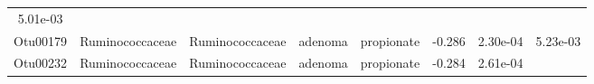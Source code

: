 \documentclass[11pt,]{article}
\begin{document}
\begin{longtable}[]{@{}cccccccc@{}}
\begin{minipage}[t]{0.08\columnwidth}
5.01e-03\strut
\end{minipage}\tabularnewline
\begin{minipage}[t]{0.08\columnwidth}\centering\strut
Otu00179\strut
\end{minipage} & \begin{minipage}[t]{0.15\columnwidth}\centering\strut
Ruminococcaceae\strut
\end{minipage} & \begin{minipage}[t]{0.15\columnwidth}\centering\strut
Ruminococcaceae\strut
\end{minipage} & \begin{minipage}[t]{0.08\columnwidth}\centering\strut
adenoma\strut
\end{minipage} & \begin{minipage}[t]{0.09\columnwidth}\centering\strut
propionate\strut
\end{minipage} & \begin{minipage}[t]{0.07\columnwidth}\centering\strut
-0.286\strut
\end{minipage} & \begin{minipage}[t]{0.08\columnwidth}\centering\strut
2.30e-04\strut
\end{minipage} & \begin{minipage}[t]{0.08\columnwidth}\centering\strut
5.23e-03\strut
\end{minipage}\tabularnewline
\begin{minipage}[t]{0.08\columnwidth}\centering\strut
Otu00232\strut
\end{minipage} & \begin{minipage}[t]{0.15\columnwidth}\centering\strut
Ruminococcaceae\strut
\end{minipage} & \begin{minipage}[t]{0.15\columnwidth}\centering\strut
Ruminococcaceae\strut
\end{minipage} & \begin{minipage}[t]{0.08\columnwidth}\centering\strut
adenoma\strut
\end{minipage} & \begin{minipage}[t]{0.09\columnwidth}\centering\strut
propionate\strut
\end{minipage} & \begin{minipage}[t]{0.07\columnwidth}\centering\strut
-0.284\strut
\end{minipage} & \begin{minipage}[t]{0.08\columnwidth}\centering\strut
2.61e-04\strut
\end{minipage} & \begin{minipage}[t]{0.08\columnwidth}\centering\strut

\end{minipage}
\end{longtable}
\end{document}
